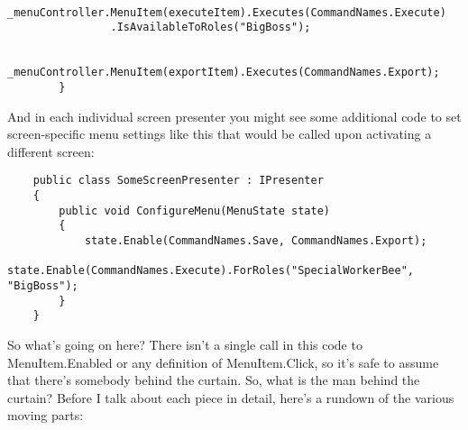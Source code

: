 \documentclass{article}
\begin{document}
{\begin{lstlisting}
            _menuController.MenuItem(executeItem).Executes(CommandNames.Execute)
                .IsAvailableToRoles("BigBoss"); 

            _menuController.MenuItem(exportItem).Executes(CommandNames.Export);
        }
\end{lstlisting}

And in each individual screen presenter you might see some additional code to set screen-specific menu settings like this that would be called upon activating a different screen:

\begin{lstlisting}
    public class SomeScreenPresenter : IPresenter
    {
        public void ConfigureMenu(MenuState state)
        {
            state.Enable(CommandNames.Save, CommandNames.Export);
            state.Enable(CommandNames.Execute).ForRoles("SpecialWorkerBee", "BigBoss");
        }
    }
\end{lstlisting}	

So what's going on here?  There isn't a single call in this code to MenuItem.Enabled or any definition of MenuItem.Click, so it's safe to assume that there's somebody behind the curtain.  So, what is the man behind the curtain?  Before I talk about each piece in detail, here's a rundown of the various moving parts:

}
\end{document}

